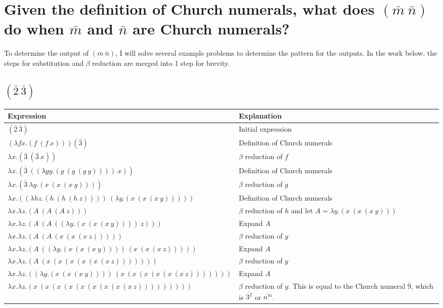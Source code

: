 \documentclass[letterpaper, 10pt, DIV=13]{scrartcl}
\numberwithin{equation}{section}
\numberwithin{figure}{section}
\numberwithin{table}{section}
\begin{document}
\section{Given the definition of Church numerals, what does $(\bar{m}~\bar{n})$ do when $\bar{m}$ and $\bar{n}$ are Church numerals?}
To determine the output of $(\bar{m}~\bar{n})$, I will solve several example problems to determine the pattern for the outputs.
In the work below, the steps for substitution and $\beta$ reduction are merged into 1 step for brevity.

\subsection{$(\bar{2}~\bar{3})$}
\begin{center}
\begin{tabularx}{\textwidth}{|Y|Y|}
    \hline
    Expression & Explanation \\
    \hline
    $(\bar{2}~\bar{3})$ & Initial expression \\
    \hline
    $(\lambda fx.(f~(f~x)))(\bar{3})$ & Definition of Church numerals \\
    \hline
    $\lambda x.(\bar{3}~(\bar{3}~x))$ & $\beta$ reduction of $f$ \\
    \hline
    $\lambda x.(\bar{3}~((\lambda gy.(g~(g~(g~y))))~x))$ & Definition of Church numerals \\
    \hline
    $\lambda x.(\bar{3}~\lambda y.(x~(x~(x~y))))$ & $\beta$ reduction of $g$ \\
    \hline
    $\lambda x.((\lambda hz.(h~(h~(h~z))))~(\lambda y.(x~(x~(x~y)))))$ & Definition of Church numerals \\
    \hline
    $\lambda x.\lambda z.(A~(A~(A~z)))$ & $\beta$ reduction of $h$ and let $A = \lambda y.(x~(x~(x~y)))$ \\
    \hline
    $\lambda x.\lambda z.(A~(A~((\lambda y.(x~(x~(x~y))))~z)))$ & Expand $A$ \\
    \hline
    $\lambda x.\lambda z.(A~(A~(x~(x~(x~z)))))$ & $\beta$ reduction of $y$ \\
    \hline
    $\lambda x.\lambda z.(A~((\lambda y.(x~(x~(x~y))))~(x~(x~(x~z)))))$ & Expand $A$ \\
    \hline
    $\lambda x.\lambda z.(A~(x~(x~(x~(x~(x~(x~z)))))))$ & $\beta$ reduction of $y$ \\
    \hline
    $\lambda x.\lambda z.((\lambda y.(x~(x~(x~y))))~(x~(x~(x~(x~(x~(x~z)))))))$ & Expand $A$ \\
    \hline
    $\lambda x.\lambda z.(x~(x~(x~(x~(x~(x~(x~(x~(x~z)))))))))$ & $\beta$ reduction of $y$. This is equal to
    the Church numeral $\bar{9}$, which is $\overline{3^2}$ or $\overline{n^m}$. \\
    \hline
\end{tabularx}
\end{center}
\end{document}
